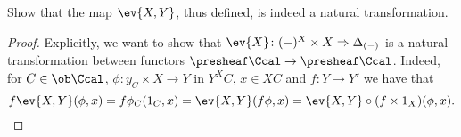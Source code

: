 \begin{exercise}{4}
    Show that the map $\ev{X,Y}$, thus defined, is indeed a natural transformation.
    \begin{solution}
        \begin{proof}
            Explicitly, we want to show that $\ev{X}\colon (-)^X\times X\Rightarrow\Delta_{(-)}$ is a natural transformation between functors $\presheaf\Ccal\to\presheaf\Ccal$. Indeed, for $C\in\ob\Ccal$, $\phi\colon y_C\times X\to Y$ in $Y^XC$, $x\in XC$ and $f\colon Y\to Y'$ we have that
            \[f\ev{X,Y}(\phi,x)=f\phi_C(1_C,x)=\ev{X,Y}(f\phi, x)=\ev{X,Y}\circ (f\times 1_X)(\phi,x).\]
        \end{proof}
    \end{solution}
\end{exercise}

